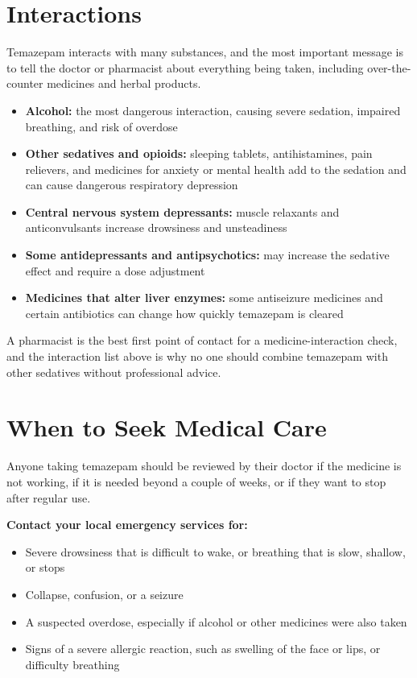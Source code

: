 \section*{Interactions}
Temazepam interacts with many substances, and the most important message is to tell the doctor or pharmacist about everything being taken, including over-the-counter medicines and herbal products.

\begin{itemize}
    \item \textbf{Alcohol:} the most dangerous interaction, causing severe sedation, impaired breathing, and risk of overdose
    \item \textbf{Other sedatives and opioids:} sleeping tablets, antihistamines, pain relievers, and medicines for anxiety or mental health add to the sedation and can cause dangerous respiratory depression
    \item \textbf{Central nervous system depressants:} muscle relaxants and anticonvulsants increase drowsiness and unsteadiness
    \item \textbf{Some antidepressants and antipsychotics:} may increase the sedative effect and require a dose adjustment
    \item \textbf{Medicines that alter liver enzymes:} some antiseizure medicines and certain antibiotics can change how quickly temazepam is cleared
\end{itemize}

A pharmacist is the best first point of contact for a medicine-interaction check, and the interaction list above is why no one should combine temazepam with other sedatives without professional advice.

\section*{When to Seek Medical Care}
Anyone taking temazepam should be reviewed by their doctor if the medicine is not working, if it is needed beyond a couple of weeks, or if they want to stop after regular use.

\textbf{Contact your local emergency services for:}
\begin{itemize}
    \item Severe drowsiness that is difficult to wake, or breathing that is slow, shallow, or stops
    \item Collapse, confusion, or a seizure
    \item A suspected overdose, especially if alcohol or other medicines were also taken
    \item Signs of a severe allergic reaction, such as swelling of the face or lips, or difficulty breathing
\end{itemize}

